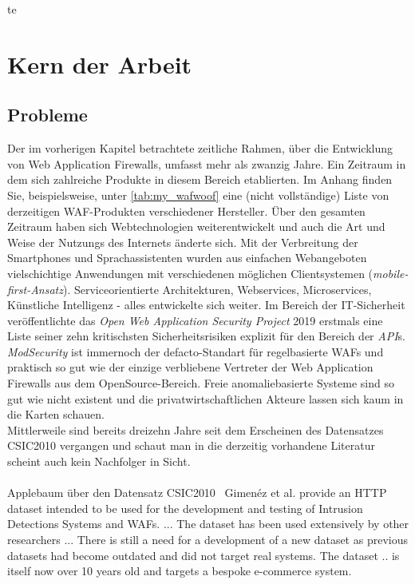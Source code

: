 te\chapter{Kern der Arbeit}


\section{Probleme}
\label{sec:Probleme}

Der im vorherigen Kapitel betrachtete zeitliche Rahmen, über die Entwicklung von Web Application Firewalls, umfasst mehr als zwanzig Jahre. Ein Zeitraum in dem sich zahlreiche Produkte in diesem Bereich etablierten. Im Anhang finden Sie, beispielsweise, unter \ref{tab:my_wafwoof} eine (nicht vollständige) Liste von derzeitigen WAF-Produkten verschiedener Hersteller. Über den gesamten Zeitraum haben sich Webtechnologien weiterentwickelt und auch die Art und Weise der Nutzungs des Internets änderte sich. Mit der Verbreitung der Smartphones und Sprachassistenten wurden aus einfachen Webangeboten vielschichtige Anwendungen mit verschiedenen möglichen Clientsystemen (\emph{mobile-first-Ansatz}). Serviceorientierte Architekturen, Webservices, Microservices, Künstliche Intelligenz - alles entwickelte sich weiter. Im Bereich der IT-Sicherheit veröffentlichte das \emph{Open Web Application Security Project} 2019 erstmals eine Liste seiner zehn kritischsten Sicherheitsrisiken explizit für den Bereich der \emph{API}s. \emph{ModSecurity} ist immernoch der defacto-Standart für regelbasierte WAFs und praktisch so gut wie der einzige verbliebene Vertreter der Web Application Firewalls aus dem OpenSource-Bereich. Freie anomaliebasierte Systeme sind so gut wie nicht existent und die privatwirtschaftlichen Akteure lassen sich kaum in die Karten schauen. \\
Mittlerweile sind bereits dreizehn Jahre seit dem Erscheinen des Datensatzes CSIC2010 vergangen und schaut man in die derzeitig vorhandene Literatur scheint auch kein Nachfolger in Sicht. \\\\

\textcolor{bhtGray}{ Applebaum über den Datensatz CSIC2010~\cite{Applebaum2021}} Gimenéz et al. provide an HTTP dataset intended to be used for the development and testing of Intrusion Detections Systems and WAFs. ... The dataset has been used extensively by other researchers ... There is still a need for a development of a new dataset as previous datasets had become outdated and did not target real systems. The dataset .. is itself now over 10 years old and targets a bespoke e-commerce system. \\\\


